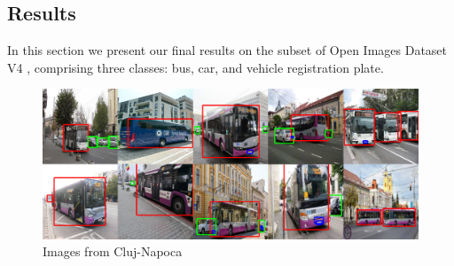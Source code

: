 \subsection{Results}
    In this section we present our final results on the subset of Open Images Dataset V4 \cite{openImages}, comprising three classes: bus, car, and vehicle registration plate.
        
    \begin{figure}[!b]
      \centering
      \includegraphics[scale=0.1]{images/cover.png}
        \caption{Images from Cluj-Napoca}
        \label{cluj}
    \end{figure}
    

    \def \scalevartuning {0.3}
    
